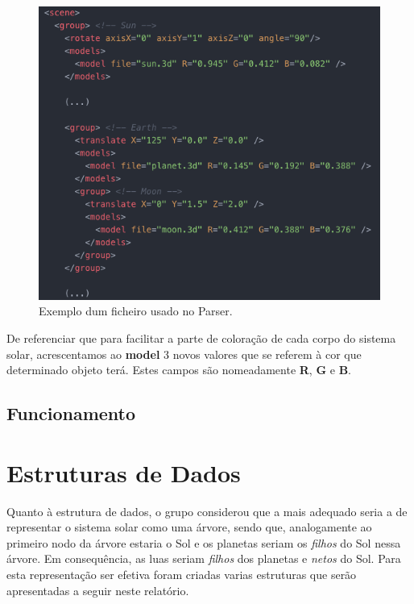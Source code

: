 \documentclass[a4paper]{article}
\begin{document}
\begin{figure}[H]
\centering
\includegraphics[scale=0.6]{ficheiro_parser.png}
\caption{Exemplo dum ficheiro usado no Parser.}
\label{img:ficheiro_parser}
\end{figure}

De referenciar que para facilitar a parte de coloração de cada corpo do sistema solar, acrescentamos ao \textbf{model} 3 novos valores que se referem à cor que determinado objeto terá. Estes campos são nomeadamente \textbf{R}, \textbf{G} e \textbf{B}.

\subsection{Funcionamento}
\label{sec:funcionamento}


\newpage

\section{Estruturas de Dados}
\label{sec:estruturas}
Quanto à estrutura de dados, o grupo considerou que a mais adequado seria a de representar o sistema solar como uma árvore, sendo que, analogamente ao primeiro nodo da árvore estaria o Sol e os planetas seriam os \textit{filhos} do Sol nessa árvore. Em consequência, as luas seriam \textit{filhos} dos planetas e \textit{netos} do Sol.  Para esta representação ser efetiva foram criadas varias estruturas que serão apresentadas a seguir neste relatório.
\end{document}
